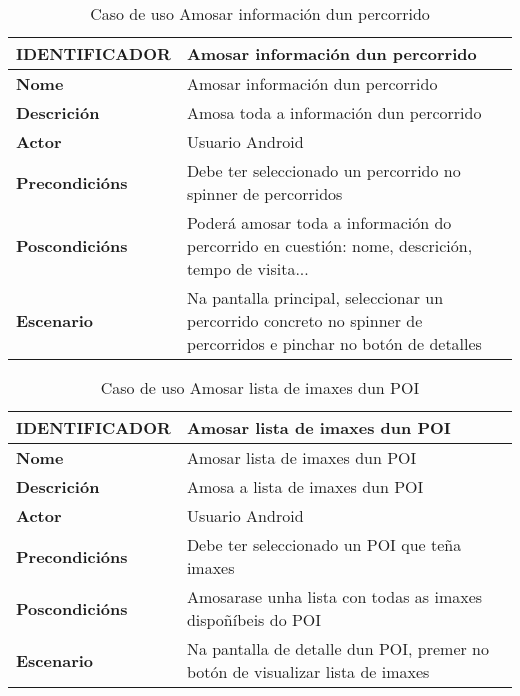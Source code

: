\begin{table}[tbp]
	\begin{tabular}{|l|p{10cm}|}
		\hline 
		\textbf{IDENTIFICADOR}	& \textbf{Amosar información dun percorrido} \\ 
		\hline 
		\textbf{Nome} & Amosar información dun percorrido \\ 
		\hline 
		\textbf{Descrición} & Amosa toda a información dun percorrido \\ 
		\hline 
		\textbf{Actor} & Usuario Android \\ 
		\hline 
		\textbf{Precondicións} & Debe ter seleccionado un percorrido no spinner de percorridos \\ 
		\hline 
		\textbf{Poscondicións} & Poderá amosar toda a información do percorrido en cuestión: nome, descrición, tempo de visita... \\ 
		\hline 
		\textbf{Escenario} & Na pantalla principal, seleccionar un percorrido concreto no spinner de percorridos e pinchar no botón de detalles \\ 
		\hline 
	\end{tabular}
	\caption{Caso de uso Amosar información dun percorrido}
	\label{tab:cuAmosarPercorrido}
\end{table}

\begin{table}[tbp]
	\begin{tabular}{|l|p{10cm}|}
		\hline 
		\textbf{IDENTIFICADOR}	& \textbf{Amosar lista de imaxes dun POI} \\ 
		\hline 
		\textbf{Nome} & Amosar lista de imaxes dun POI \\ 
		\hline 
		\textbf{Descrición} & Amosa a lista de imaxes dun POI \\ 
		\hline 
		\textbf{Actor} & Usuario Android \\ 
		\hline 
		\textbf{Precondicións} & Debe ter seleccionado un POI que teña imaxes \\ 
		\hline 
		\textbf{Poscondicións} & Amosarase unha lista con todas as imaxes dispoñíbeis do POI \\ 
		\hline 
		\textbf{Escenario} & Na pantalla de detalle dun POI, premer no botón de visualizar lista de imaxes \\ 
		\hline 
	\end{tabular}
	\caption{Caso de uso Amosar lista de imaxes dun POI}
	\label{tab:cuAmosarListaImaxePOI}
\end{table}


